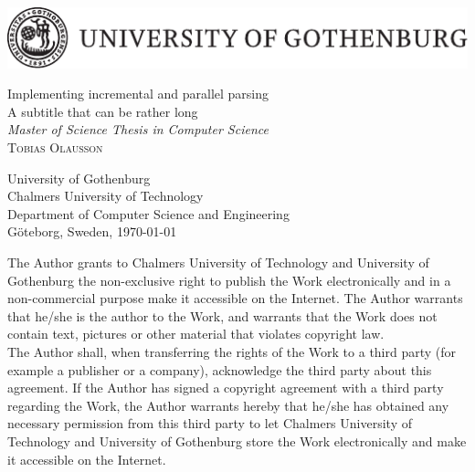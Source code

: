 \begin{titlepage}

\begin{center}
\includegraphics[width=\textwidth]{gulogo.pdf}
\end{center}


\vfill

\begin{flushleft}
{\LARGE Implementing incremental and parallel parsing} \\[0.2cm]
{\Large A subtitle that can be rather long} \\[0.5cm]
{\large \textit{Master of Science Thesis in Computer Science}}\\[2cm]

{\Huge \textsc{Tobias Olausson}}

\vfill

University of Gothenburg \\
Chalmers University of Technology \\
Department of Computer Science and Engineering \\
Göteborg, Sweden, \monthdate\today
\end{flushleft}

\newpage

\noindent The Author grants to Chalmers University of Technology and University
of Gothenburg  the non-exclusive right to publish the Work electronically and in
a non-commercial purpose make it accessible on the Internet.  The Author
warrants that he/she is the author to the Work, and warrants that the Work does
not contain text, pictures or other material that violates copyright law.\\

\noindent The Author shall, when transferring the rights of the Work to a third
party (for example a publisher or a company), acknowledge the third party about
this agreement. If the Author has signed a copyright agreement with a third
party regarding the Work, the Author warrants hereby that he/she has obtained
any necessary permission from this third party to let Chalmers University of
Technology and University of Gothenburg  store the Work electronically and make
it accessible on the Internet. \\[2cm]


\end{titlepage}

